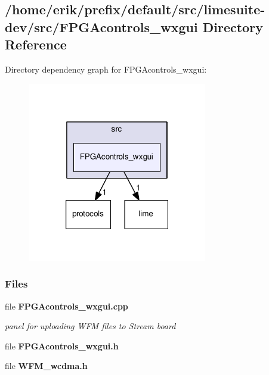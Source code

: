 \subsection{/home/erik/prefix/default/src/limesuite-\/dev/src/\+F\+P\+G\+Acontrols\+\_\+wxgui Directory Reference}
\label{dir_fe2efaae8e3f4e2c3ea84df85d5a0e84}
Directory dependency graph for F\+P\+G\+Acontrols\+\_\+wxgui\+:
\nopagebreak
\begin{figure}[H]
\begin{center}
\leavevmode
\includegraphics[width=222pt]{dir_fe2efaae8e3f4e2c3ea84df85d5a0e84_dep}
\end{center}
\end{figure}
\subsubsection*{Files}
\begin{DoxyCompactItemize}
\item 
file {\bf F\+P\+G\+Acontrols\+\_\+wxgui.\+cpp}
\begin{DoxyCompactList}\small\item\em panel for uploading W\+FM files to Stream board \end{DoxyCompactList}\item 
file {\bf F\+P\+G\+Acontrols\+\_\+wxgui.\+h}
\item 
file {\bf W\+F\+M\+\_\+wcdma.\+h}
\end{DoxyCompactItemize}
